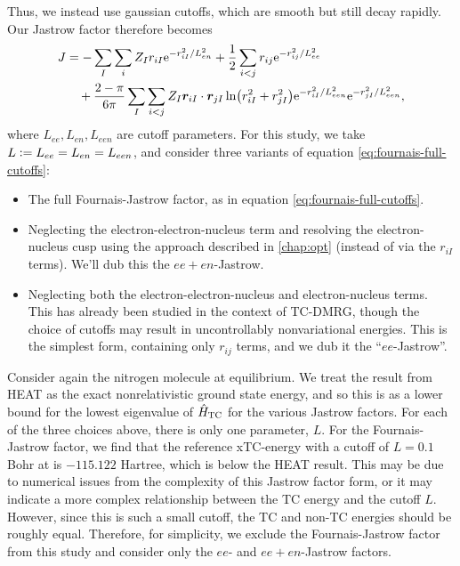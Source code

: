 Thus, we instead use gaussian cutoffs, which are smooth but still decay rapidly. Our Jastrow factor therefore becomes
\begin{align}
    \label{eq:fournais-full-cutoffs}
    J &= -\sum_I\sum_i Z_Ir_{iI}\mathrm{e}^{-r_{iI}^2/L_{en}^2} + \frac 12\sum_{i<j}r_{ij}\mathrm{e}^{-r_{ij}^2/L_{ee}^2} \nonumber \\
    &\quad + \frac{2-\pi}{6\pi}\sum_I\sum_{i<j}Z_I\bm r_{iI}\cdot \bm r_{jI}\ln(r_{iI}^2+r_{jI}^2)\mathrm{e}^{-r_{iI}^2/L_{een}^2}\mathrm{e}^{-r_{jI}^2/L_{een}^2},
\end{align}
where $L_{ee}, L_{en}, L_{een}$ are cutoff parameters. For this study, we take $L\mathrel{\mathop:}= L_{ee} = L_{en} = L_{een}$, and consider three variants of equation \ref{eq:fournais-full-cutoffs}:
\begin{itemize}
    \item The full Fournais-Jastrow factor, as in equation \ref{eq:fournais-full-cutoffs}.
    \item Neglecting the electron-electron-nucleus term and resolving the electron-nucleus cusp using the approach described in \autoref{chap:opt} (instead of via the $r_{iI}$ terms). We'll dub this the $ee+en$-Jastrow.
    \item Neglecting both the electron-electron-nucleus and electron-nucleus terms. This has already been studied in the context of TC-DMRG,\supercite{szenesStriking2024} though the choice of cutoffs may result in uncontrollably nonvariational energies. This is the simplest form, containing only $r_{ij}$ terms, and we dub it the ``$ee$-Jastrow''.
\end{itemize}

Consider again the nitrogen molecule at equilibrium. We treat the result from \gls{HEAT}\supercite{fellerSurvey2008} as the exact nonrelativistic ground state energy, and so this is as a lower bound for the lowest eigenvalue of $\hat H_\mathrm{TC}$ for the various Jastrow factors. For each of the three choices above, there is only one parameter, $L$. For the Fournais-Jastrow factor, we find that the reference xTC-energy with a cutoff of $L=0.1$ Bohr at \avtz is $-115.122$ Hartree, which is below the HEAT result. This may be due to numerical issues from the complexity of this Jastrow factor form, or it may indicate a more complex relationship between the TC energy and the cutoff $L$. However, since this is such a small cutoff, the TC and non-TC energies should be roughly equal. Therefore, for simplicity, we exclude the Fournais-Jastrow factor from this study and consider only the $ee$- and $ee+en$-Jastrow factors.

